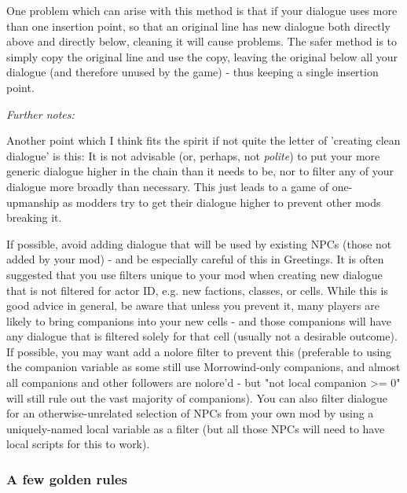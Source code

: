 \documentclass[
]{article}
\begin{document}
One problem which can arise with this method is that if your dialogue
uses more than one insertion point, so that an original line has new
dialogue both directly above and directly below, cleaning it will cause
problems. The safer method is to simply copy the original line and use
the copy, leaving the original below all your dialogue (and therefore
unused by the game) - thus keeping a single insertion point.

\emph{Further notes:}

Another point which I think fits the spirit if not quite the letter of
'creating clean dialogue' is this: It is not advisable (or, perhaps, not
\emph{polite}) to put your more generic dialogue higher in the chain
than it needs to be, nor to filter any of your dialogue more broadly
than necessary. This just leads to a game of one-upmanship as modders
try to get their dialogue higher to prevent other mods breaking it.

If possible, avoid adding dialogue that will be used by existing NPCs
(those not added by your mod) - and be especially careful of this in
Greetings. It is often suggested that you use filters unique to your mod
when creating new dialogue that is not filtered for actor ID, e.g. new
factions, classes, or cells. While this is good advice in general, be
aware that unless you prevent it, many players are likely to bring
companions into your new cells - and those companions will have any
dialogue that is filtered solely for that cell (usually not a desirable
outcome). If possible, you may want add a nolore filter to prevent this
(preferable to using the companion variable as some still use
Morrowind-only companions, and almost all companions and other followers
are nolore'd - but "not local companion \textgreater= 0" will still rule
out the vast majority of companions). You can also filter dialogue for
an otherwise-unrelated selection of NPCs from your own mod by using a
uniquely-named local variable as a filter (but all those NPCs will need
to have local scripts for this to work).

\hypertarget{a-few-golden-rules}{%
\subsubsection{A few golden rules}\label{a-few-golden-rules}}
\end{document}
